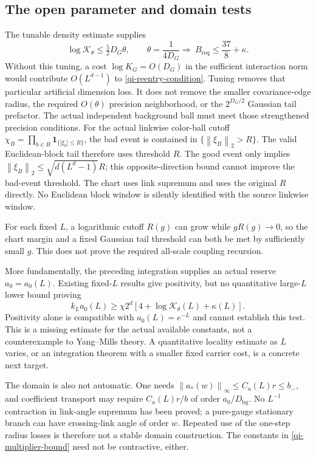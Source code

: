 \documentclass[11pt]{article}
\theoremstyle{remark}
\newcommand{\norm}[1]{\left\|#1\right\|}
\begin{document}
\subsection{The open parameter and domain tests}

The tunable density estimate supplies
\begin{equation}\label{qi-dimension-tuning}
 \log\mathcal K_\theta\le\tfrac52 D_G\theta,
 \qquad \theta=\frac1{4D_G} \Longrightarrow\
 B_{\mathrm{req}}\le\frac{37}{8}+\kappa.
\end{equation}
Without this tuning, a cost $\log K_G=O(D_G)$ in the
sufficient interaction norm would contribute $O(L^{d-1})$
to \eqref{qi-reentry-condition}. Tuning removes that
particular artificial dimension loss. It does not remove
the smaller covariance-edge radius, the required $O(\theta)$
precision neighborhood, or the $2^{D_G/2}$ Gaussian tail
prefactor. The actual independent background ball must meet
those strengthened precision conditions. For the actual
linkwise color-ball cutoff
$\chi_B=\prod_{b\in B}\mathbf1_{\{|\xi_b|\le R\}}$,
the bad event is contained in $\{\norm{\xi_B}_2>R\}$.
The valid Euclidean-block tail therefore uses threshold $R$.
The good event only implies
$\norm{\xi_B}_2\le\sqrt{d(L^d-1)}R$; this opposite-direction
bound cannot improve the bad-event threshold. The chart
uses link supremum and uses the original $R$ directly.
No Euclidean block window is silently identified with the
source linkwise window.

For each fixed $L$, a logarithmic cutoff $R(g)$ can grow while
$gR(g)\to0$, so the chart margin and a fixed Gaussian tail
threshold can both be met by sufficiently small $g$. This
does not prove the required all-scale coupling recursion.

More fundamentally, the preceding integration supplies an
actual reserve $a_0=a_0(L)$. Existing fixed-$L$ results give
positivity, but no quantitative large-$L$ lower bound proving
\begin{equation}\label{qi-open-L-test}
 k_L a_0(L)\ge
       \chi2^d[4+\log\mathcal K_\theta(L)+\kappa(L)].
\end{equation}
Positivity alone is compatible with $a_0(L)=e^{-L}$ and
cannot establish this test. This is a missing estimate for
the actual available constants, not a counterexample to
Yang--Mills theory. A quantitative locality estimate as $L$
varies, or an integration theorem with a smaller fixed
carrier cost, is a concrete next target.

The domain is also not automatic. One needs
$\norm{a_*(w)}_\infty\le C_a(L)r\le b_-$, and coefficient
transport may require $C_a(L)r/b$ of order
$a_0/D_{\mathrm{bg}}$. No $L^{-1}$ contraction in link-angle
supremum has been proved; a pure-gauge stationary branch can
have crossing-link angle of order $w$. Repeated use of the
one-step radius losses is therefore not a stable domain
construction. The constants in \eqref{qi-multiplier-bound}
need not be contractive, either.
\end{document}
